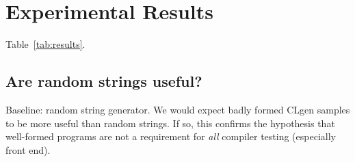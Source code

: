 \section{Experimental Results}\label{sec:results}

Table~\ref{tab:results}.

\subsection{Are random strings useful?}

Baseline: random string generator. We would expect badly formed CLgen samples to be more useful than random strings. If so, this confirms the hypothesis that well-formed programs are not a requirement for \emph{all} compiler testing (especially front end).

